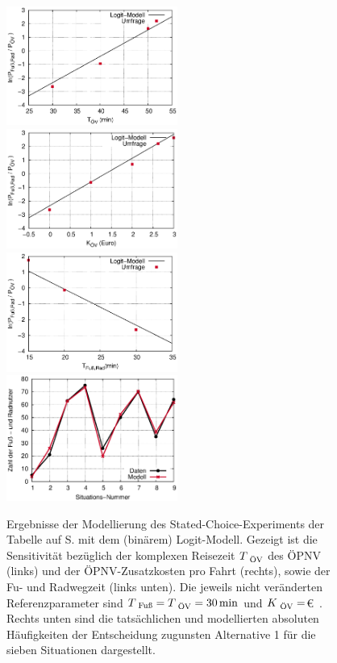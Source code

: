 \begin{figure}
\includegraphics[width=0.50\textwidth]{figsErh/VkoekSS09_statedChoice_1.eps}
\includegraphics[width=0.50\textwidth]{figsErh/VkoekSS09_statedChoice_2.eps}
\includegraphics[width=0.50\textwidth]{figsErh/VkoekSS09_statedChoice_3.eps}
\includegraphics[width=0.50\textwidth]{figsErh/VkoekSS09_statedChoice_4.eps}
\caption{\label{fig:statedChoice} Ergebnisse der Modellierung des
Stated-Choice-Experiments der Tabelle auf S. \pageref{tab:statedChoice} mit dem
(bin\"arem) Logit-Modell. Gezeigt ist die Sensitivit\"at bez\"uglich
der komplexen Reisezeit $T_{{\mbox{ {\scriptsize \hspace{-0.0ex}\"OV}}}}$ des \"OPNV (links) und
der \"OPNV-Zusatzkosten pro Fahrt  (rechts), sowie der Fu\3- und
Radwegzeit (links unten). Die jeweils nicht ver\"anderten 
Referenzparameter sind
$T\sub{Fu\3}=T\sub{\"OV}=\unit[30]{min}$ und
$K_{{\mbox{ {\scriptsize \hspace{-0.0ex}\"OV}}}}=$\unit[0]{\euro{}}. Rechts unten sind die tats\"achlichen
und modellierten absoluten H\"aufigkeiten der Entscheidung zugunsten
Alternative 1 f\"ur die sieben Situationen dargestellt.
}
\end{figure}

